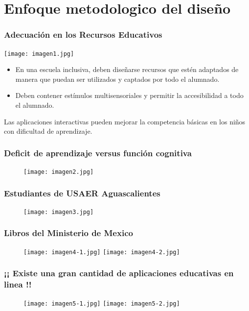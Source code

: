 \documentclass[11pt]{beamer}
\begin{document}
\section{Enfoque metodologico del diseño}
\begin{frame}
\frametitle{Adecuación en los Recursos Educativos}
    \justify
    \begin{minipage}[c]{0.4\textwidth} 
    \texttt{[image: imagen1.jpg]} 
    \end{minipage}
    \begin{minipage}[c]{0.55\textwidth}
        \begin{itemize}
        \item En una escuela inclusiva, deben diseñarse recursos que estén adaptados de manera que puedan ser utilizados y captados por todo el alumnado.
        \item Deben contener estímulos multisensoriales y permitir la accesibilidad a todo el alumnado.
        \end{itemize}
        Las aplicaciones interactivas pueden mejorar la competencia básicas en los niños con dificultad de aprendizaje.
    \end{minipage}
\end{frame}

\begin{frame}
\frametitle{Deficit de aprendizaje versus función cognitiva}
    \begin{figure}
    \centering
     \texttt{[image: imagen2.jpg]} 
    \end{figure}
\end{frame}

\begin{frame}
\frametitle{Estudiantes de USAER Aguascalientes}
    \begin{figure}
    \centering
     \texttt{[image: imagen3.jpg]} 
    \end{figure}
\end{frame}

\begin{frame}
\frametitle{Libros del Ministerio de Mexico}
    \begin{figure}
    \centering
     \texttt{[image: imagen4-1.jpg]}
     \texttt{[image: imagen4-2.jpg]}
    \end{figure}
\end{frame}

\begin{frame}
\frametitle{¡¡ Existe una gran cantidad de aplicaciones educativas en linea !!}
    \begin{figure}
    \centering
     \texttt{[image: imagen5-1.jpg]}
     \texttt{[image: imagen5-2.jpg]}
    \end{figure}
\end{frame}
\end{document}
